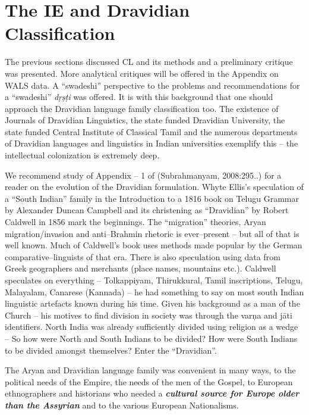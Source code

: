 \section*{The IE and Dravidian Classification}

The previous sections discussed CL and its methods and a preliminary critique was presented. More analytical critiques will be offered in the Appendix on WALS data. A “swadeshi” perspective to the problems and recommendations for a “swadeshi” \textit{dṛṣṭi} was offered. It is with this background that one should approach the Dravidian language family classification too. The existence of Journals of Dravidian Linguistics, the state funded Dravidian University, the state funded Central Institute of Classical Tamil and the numerous departments of Dravidian languages and linguistics in Indian universities exemplify this – the intellectual colonization is extremely deep.

We recommend study of Appendix – 1 of (Subrahmanyam, 2008:295..) for a reader on the evolution of the Dravidian formulation. Whyte Ellis’s speculation of a “South Indian” family in the Introduction to a 1816 book on Telugu Grammar by Alexander Duncan Campbell and its christening as “Dravidian” by Robert Caldwell in 1856 mark the beginnings. The “migration” theories, Aryan migration/invasion and anti–Brahmin rhetoric is ever–present – but all of that is well known. Much of Caldwell’s book uses methods made popular by the German comparative–linguists of that era. There is also speculation using data from Greek geographers and merchants (place names, mountains etc.). Caldwell speculates on everything – Tolkappiyam, Thirukkural, Tamil inscriptions, Telugu, Malayalam, Canarese (Kannada) – he had something to say on most south Indian linguistic artefacts known during his time. Given his background as a man of the Church – his motives to find division in society was through the varņa and jāti identifiers. North India was already sufficiently divided using religion as a wedge – So how were North and South Indians to be divided? How were South Indians to be divided amongst themselves? Enter the “Dravidian”.

The Aryan and Dravidian language family was convenient in many ways, to the political needs of the Empire, the needs of the men of the Gospel, to European ethnographers and historians who needed a \textbf{\textit{cultural source for Europe older than the Assyrian}} and to the various European Nationalisms.

